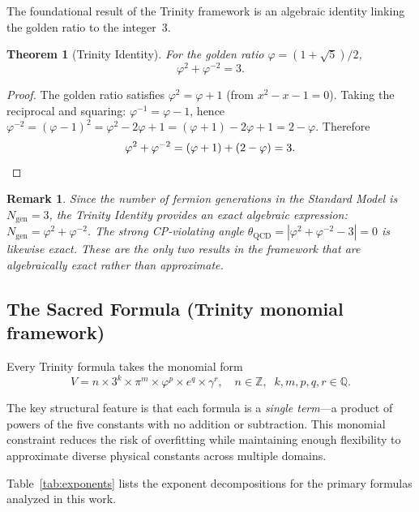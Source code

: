 \documentclass[11pt,a4paper]{article}
\newtheorem{theorem}{Theorem}
\newtheorem{remark}{Remark}
\newcommand{\vp}{\varphi}
\newcommand{\Ngen}{N_{\mathrm{gen}}}
\begin{document}
The foundational result of the Trinity framework is an algebraic identity
linking the golden ratio to the integer~3.

\begin{theorem}[Trinity Identity]\label{thm:trinity}
For the golden ratio $\vp=(1+\sqrt{5})/2$,
\begin{equation}
  \vp^{2}+\vp^{-2} = 3. \label{eq:trinity}
\end{equation}
\end{theorem}

\begin{proof}
The golden ratio satisfies $\vp^{2}=\vp+1$ (from $x^{2}-x-1=0$). Taking the
reciprocal and squaring: $\vp^{-1}=\vp-1$, hence
$\vp^{-2}=(\vp-1)^{2}=\vp^{2}-2\vp+1 = (\vp+1)-2\vp+1 = 2-\vp$. Therefore
\[
  \vp^{2}+\vp^{-2} = (\vp+1)+(2-\vp) = 3. \qedhere
\]
\end{proof}

\begin{remark}
Since the number of fermion generations in the Standard Model is
$\Ngen=3$, the Trinity Identity provides an exact algebraic expression:
$\Ngen = \vp^{2}+\vp^{-2}$. The strong CP-violating angle
$\theta_{\mathrm{QCD}}=|\vp^{2}+\vp^{-2}-3|=0$ is likewise exact. These are
the only two results in the framework that are algebraically exact rather than
approximate.
\end{remark}

\subsection{The Sacred Formula (Trinity monomial framework)}\label{sec:sacred}

Every Trinity formula takes the monomial form
\begin{equation}
  V = n \times 3^{k} \times \pi^{m} \times \vp^{p} \times e^{q} \times \gamma^{r},
  \quad n\in\mathbb{Z},\;\; k,m,p,q,r\in\mathbb{Q}.
  \label{eq:sacred}
\end{equation}

The key structural feature is that each formula is a \emph{single term}---a
product of powers of the five constants with no addition or subtraction. This
monomial constraint reduces the risk of overfitting while maintaining enough
flexibility to approximate diverse physical constants across multiple domains.

Table~\ref{tab:exponents} lists the exponent decompositions for the primary
formulas analyzed in this work.
\end{document}
